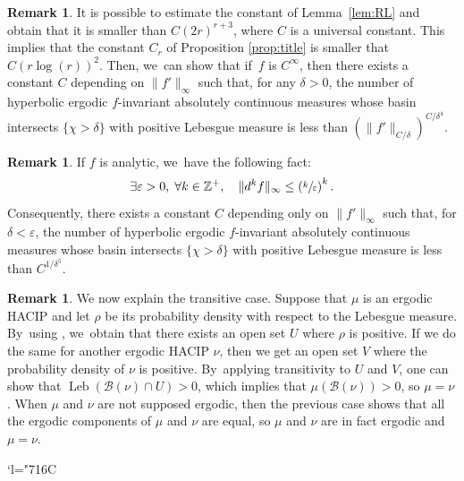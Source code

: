 \documentclass[JEP,XML,SOM,Unicode,NoFloatCountersInSection,published]{cedram}
\newcommand{\Changelback}{\mathcode`l="716C}
\DeclareMathOperator{\Leb}{Leb}
\let\rC C
\theoremstyle{definition}
\newtheorem{rmq}[thm]{Remark}
\newcommand{\bbZ}{{\mathbb{Z}}}
\begin{document}
\begin{rmq}
It is possible to estimate the constant of Lemma~\ref{lem:RL} and obtain that it is smaller than $C (2r)^{r+3}$, where $C$ is a universal constant. This implies that the constant $C_r$ of Proposition \ref{prop:title} is smaller that $C (r \log(r))^2$. Then, we~can show that if~$f$ is $\rC^{\infty}$, then there exists a constant $C$ depending on $\| f' \|_{\infty}$ such that, for any $\delta > 0$, the number of hyperbolic ergodic $f$\nobreakdash-invariant absolutely continuous measures whose basin intersects $\{ \chi > \delta \}$ with positive Lebesgue measure is less than
$
\left (\| f' \|_{C/\delta} \right)^{C / \delta^4}
$.
\end{rmq}

\begin{rmq}
\label{rmq:analytic}
If $f$ is analytic, we~have the following fact:
\[
\exists \varepsilon > 0,\; \forall k \in \bbZ^+,\quad \| d^k f\|_{\infty} \leq \left (\sfrac{k}{\varepsilon} \right)^k.
\]
Consequently, there exists a constant $C$ depending only on $\| f' \|_{\infty}$ such that, for $\delta < \varepsilon$, the number of hyperbolic ergodic $f$\nobreakdash-invariant absolutely continuous measures whose basin intersects $\{ \chi > \delta \}$ with positive Lebesgue measure is less than
$
C^{1 / \delta^5}
$.
\end{rmq}

\begin{rmq}
\label{rmq:trans}
We now explain the transitive case. Suppose that $\mu$ is an ergodic HACIP and let $\rho$ be its probability density with respect to the Lebesgue measure. By~using \cite[Lem.\,VII.9.1]{SETE}, we~obtain that there exists an open set $U$ where $\rho$ is positive.
If we do the same for another ergodic HACIP $\nu$, then we get an open set $V$ where the probability density of $\nu$ is positive. By~applying transitivity to $U$ and $V$, one can show that $\Leb(\mathcal{B}(\nu) \cap U) > 0$, which implies that $\mu(\mathcal{B}(\nu)) > 0$, so $\mu=\nu$.
When $\mu$ and $\nu$ are not supposed ergodic, then the previous case shows that all the ergodic components of $\mu$ and $\nu$ are equal, so $\mu$ and $\nu$ are in fact ergodic and $\mu=\nu$.
\end{rmq}


\newpage

\smaller\smaller
\renewcommand{\glossaryname}{Index of notations}
\printnoidxglossary[title={Index of notations}]
\Changelback
\larger\larger
\clearpage
\renewcommand{\glossaryname}{References}


\end{document}
